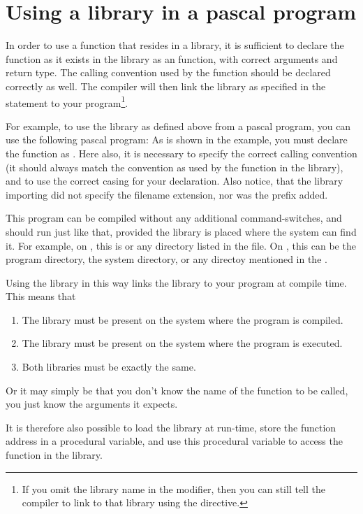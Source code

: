 \section{Using a library in a pascal program}

In order to use a function that resides in a library, it is sufficient to
declare the function as it exists in the library as an 
function, with correct arguments and return type. The calling convention
used by the function should be declared correctly as well. The compiler
will then link the library as specified in the  statement
to your program\footnote{If you omit the library name in the 
modifier, then you can still tell the compiler to link to that library using
the  directive.}.

For example, to use the library as defined above from a pascal program, you can use
the following pascal program:
As is shown in the example, you must declare the function as .
Here also, it is necessary to specify the correct calling convention (it
should always match the convention as used by the function in the library),
and to use the correct casing for your declaration. Also notice, that
the library importing did not specify the filename extension, nor
was the  prefix added.

This program can be compiled without any additional command-switches,
and should run just like that, provided the library is placed where
the system can find it. For example, on \linux, this is  or any
directory listed in the  file. On \windows, this
can be the program directory, the \windows system directory, or any directoy
mentioned in the .

Using the library in this way links the library to your program at compile
time. This means that
\begin{enumerate}
\item The library must be present on the system where the program is
compiled.
\item The library must be present on the system where the program is
executed.
\item Both libraries must be exactly the same.
\end{enumerate}
Or it may simply be that you don't know the name of the function to
be called, you just know the arguments it expects.

It is therefore also possible to load the library at run-time, store
the function address in a procedural variable, and use this procedural
variable to access the function in the library.

